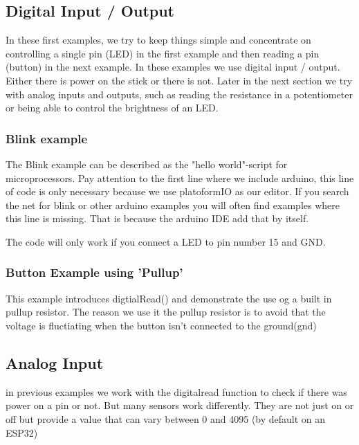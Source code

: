 \documentclass[12pt, a4paper]{article}
\begin{document}
\subsection{Digital Input / Output}

In these first examples, we try to keep things simple and concentrate on controlling a single pin (LED) in the first example and then reading a pin (button) 
in the next example. In these examples we use digital input / output. 
Either there is power on the stick or there is not. 
Later in the next section we try with analog inputs and outputs, such as reading the resistance in a potentiometer or being able to control the brightness of an LED.

\subsubsection{Blink example}
The Blink example can be described as the "hello world"-script for microprocessors. Pay attention to the first line where we include arduino, this line of code is only necessary because we use platoformIO as our editor. If you search the net for blink or other arduino examples you will often find examples where this line is missing. That is because the arduino IDE add that by itself.

The code will only work if you connect a LED to pin number 15 and GND.



\subsubsection{Button Example using 'Pullup'}

This example introduces digtialRead() and demonstrate the use og a built in pullup resistor. 
The reason we use it the pullup resistor is to avoid that the voltage is fluctiating when the button isn't connected to the ground(gnd)



\subsection{Analog Input}
in previous examples we work with the digitalread function to check if there was power on a pin or not. But many sensors work differently. They are not just on or off but provide a value that can vary between 0 and 4095 (by default on an ESP32)
\end{document}
